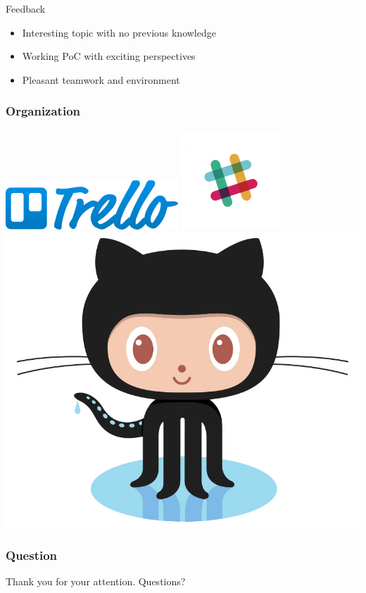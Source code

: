 
\begin{frame}{Feedback}
	\begin{itemize}
		\item Interesting topic with no previous knowledge
		\item Working PoC with exciting perspectives
		\item Pleasant teamwork and environment
	\end{itemize}
\end{frame}

\begin{frame}
	\frametitle{Organization}
	\begin{center}
		\includegraphics[scale=0.4]{figs/trello.png}
		\includegraphics[scale=0.4]{figs/slack.png}
		\includegraphics[scale=0.1]{figs/Octocat.jpg}
	\end{center}
\end{frame}


\begin{frame}
	\frametitle{Question}
	\begin{center}
		Thank you for your attention. Questions?
	\end{center}
\end{frame}